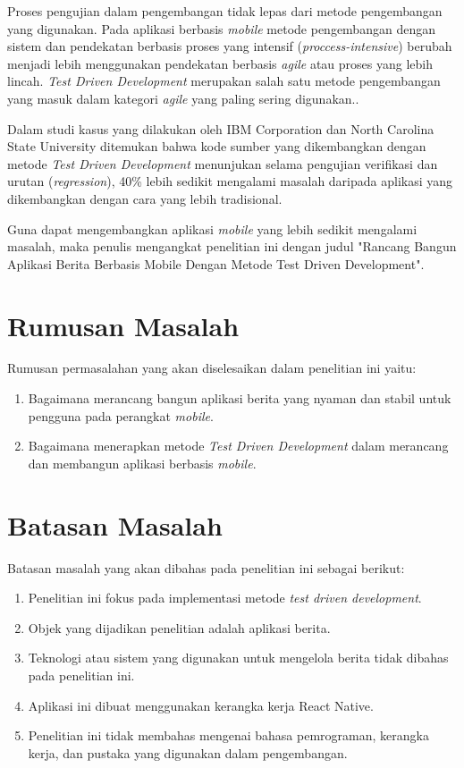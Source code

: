 \begin{spacing}{2}
Proses pengujian dalam pengembangan tidak lepas dari metode pengembangan yang digunakan. Pada aplikasi berbasis \emph{mobile} metode pengembangan dengan sistem dan pendekatan berbasis proses yang intensif (\emph{proccess-intensive}) berubah menjadi lebih menggunakan pendekatan berbasis \emph{agile} atau proses yang lebih lincah. \emph{Test Driven Development} merupakan salah satu metode pengembangan yang masuk dalam kategori \emph{agile} yang paling sering digunakan.\cite{wasserman2010}.

Dalam studi kasus yang dilakukan oleh IBM Corporation dan North Carolina State University ditemukan bahwa kode sumber yang dikembangkan dengan metode \emph{Test Driven Development} menunjukan selama pengujian verifikasi dan urutan (\emph{regression}), 40\% lebih sedikit mengalami masalah daripada aplikasi yang dikembangkan dengan cara yang lebih tradisional.\cite{laurie2003}

Guna dapat mengembangkan aplikasi \emph{mobile} yang lebih sedikit mengalami masalah, maka penulis mengangkat penelitian ini dengan judul "Rancang Bangun Aplikasi Berita Berbasis Mobile Dengan Metode Test Driven Development".

\section{Rumusan Masalah}
Rumusan permasalahan yang akan diselesaikan dalam penelitian ini yaitu:
\begin{enumerate}
  \item Bagaimana merancang bangun aplikasi berita yang nyaman dan stabil untuk pengguna pada perangkat \emph{mobile}.
  \item Bagaimana menerapkan metode \emph{Test Driven Development} dalam merancang dan membangun aplikasi berbasis \emph{mobile}.
\end{enumerate}

\section{Batasan Masalah}
Batasan masalah yang akan dibahas pada penelitian ini sebagai berikut:
\begin{enumerate}
  \item Penelitian ini fokus pada implementasi metode \emph{test driven development}.
  \item Objek yang dijadikan penelitian adalah aplikasi berita.
  \item Teknologi atau sistem yang digunakan untuk mengelola berita tidak dibahas pada penelitian ini.
  \item Aplikasi ini dibuat menggunakan kerangka kerja React Native.
  \item Penelitian ini tidak membahas mengenai bahasa pemrograman, kerangka kerja, dan pustaka yang digunakan dalam pengembangan.
\end{enumerate}


\end{spacing}
